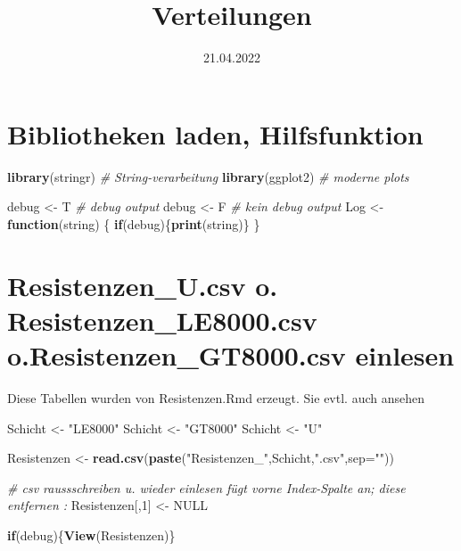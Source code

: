 \documentclass[
]{article}
\title{Verteilungen}
\author{}
\date{\vspace{-2.5em}21.04.2022}
\newenvironment{Shaded}{\begin{snugshade}}{\end{snugshade}}
\newcommand{\CommentTok}[1]{\textcolor[rgb]{0.56,0.35,0.01}{\textit{#1}}}
\newcommand{\ControlFlowTok}[1]{\textcolor[rgb]{0.13,0.29,0.53}{\textbf{#1}}}
\newcommand{\DataTypeTok}[1]{\textcolor[rgb]{0.13,0.29,0.53}{#1}}
\newcommand{\DecValTok}[1]{\textcolor[rgb]{0.00,0.00,0.81}{#1}}
\newcommand{\KeywordTok}[1]{\textcolor[rgb]{0.13,0.29,0.53}{\textbf{#1}}}
\newcommand{\NormalTok}[1]{#1}
\newcommand{\OtherTok}[1]{\textcolor[rgb]{0.56,0.35,0.01}{#1}}
\newcommand{\StringTok}[1]{\textcolor[rgb]{0.31,0.60,0.02}{#1}}
\begin{document}
\maketitle

\hypertarget{bibliotheken-laden-hilfsfunktion}{%
\section{Bibliotheken laden,
Hilfsfunktion}\label{bibliotheken-laden-hilfsfunktion}}

\begin{Shaded}
\begin{Highlighting}[]
\KeywordTok{library}\NormalTok{(stringr)    }\CommentTok{# String-verarbeitung}
\KeywordTok{library}\NormalTok{(ggplot2)    }\CommentTok{# moderne plots}

\NormalTok{debug <-}\StringTok{ }\NormalTok{T          }\CommentTok{#      debug output}
\NormalTok{debug <-}\StringTok{ }\NormalTok{F          }\CommentTok{# kein debug output}
\NormalTok{Log <-}\StringTok{ }\ControlFlowTok{function}\NormalTok{(string) \{}
  \ControlFlowTok{if}\NormalTok{(debug)\{}\KeywordTok{print}\NormalTok{(string)\}  }
\NormalTok{\}}
\end{Highlighting}
\end{Shaded}

\hypertarget{resistenzen_u.csv-o.-resistenzen_le8000.csv-o.resistenzen_gt8000.csv-einlesen}{%
\section{Resistenzen\_U.csv o. Resistenzen\_LE8000.csv
o.Resistenzen\_GT8000.csv
einlesen}\label{resistenzen_u.csv-o.-resistenzen_le8000.csv-o.resistenzen_gt8000.csv-einlesen}}

Diese Tabellen wurden von Resistenzen.Rmd erzeugt. Sie evtl. auch
ansehen

\begin{Shaded}
\begin{Highlighting}[]
\NormalTok{Schicht <-}\StringTok{ "LE8000"}
\NormalTok{Schicht <-}\StringTok{ "GT8000"}
\NormalTok{Schicht <-}\StringTok{ "U"}

\NormalTok{Resistenzen <-}\StringTok{ }\KeywordTok{read.csv}\NormalTok{(}\KeywordTok{paste}\NormalTok{(}\StringTok{"Resistenzen_"}\NormalTok{,Schicht,}\StringTok{".csv"}\NormalTok{,}\DataTypeTok{sep=}\StringTok{""}\NormalTok{))}

\CommentTok{# csv raussschreiben u. wieder einlesen fügt vorne Index-Spalte an; diese entfernen :}
\NormalTok{Resistenzen[,}\DecValTok{1}\NormalTok{] <-}\StringTok{ }\OtherTok{NULL}                      

\ControlFlowTok{if}\NormalTok{(debug)\{}\KeywordTok{View}\NormalTok{(Resistenzen)\}}
\end{Highlighting}
\end{Shaded}
\end{document}
